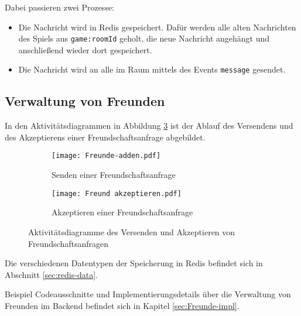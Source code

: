 Dabei passieren zwei Prozesse:
\begin{itemize}
\item Die Nachricht wird in Redis gespeichert. Dafür werden alle alten Nachrichten des Spiels aus \verb|game:roomId| geholt, die neue Nachricht angehängt und anschließend wieder dort gespeichert.
\item Die Nachricht wird an alle im Raum mittels des Events \verb|message| gesendet.
\end{itemize}

\subsection{Verwaltung von Freunden}
\label{sec:hinzufügen-von-Freunden}
In den Aktivitätsdiagrammen in Abbildung \ref{fig:Freunde-backend} ist der Ablauf des Versendens und des Akzeptierens einer Freundschaftsanfrage abgebildet.

      \begin{figure}[!htb]
      \centering
      \begin{subfigure}[b]{0.35\textwidth}
      \centering
  \texttt{[image: Freunde-adden.pdf]}
  \caption{Senden einer Freundschaftsanfrage}
  \label{fig:friend_request}
  \end{subfigure}
  \hspace{10mm}
  \begin{subfigure}[b]{0.3\textwidth}
  \centering
    \texttt{[image: Freund akzeptieren.pdf]}
  \caption{Akzeptieren einer Freundschaftsanfrage}
  \label{fig:friend_request}
  \end{subfigure}
  \caption{Aktivitätsdiagramme des Versenden und Akzeptieren von Freundschaftsanfragen}
  \label{fig:Freunde-backend}
 
\end{figure}
Die verschiedenen Datentypen der Speicherung in Redis befindet sich in Abschnitt \ref{sec:redis-data}.

Beispiel Codeausschnitte und Implementierungsdetails über die Verwaltung von Freunden im Backend befindet sich in Kapitel \ref{sec:Freunde-impl}.

